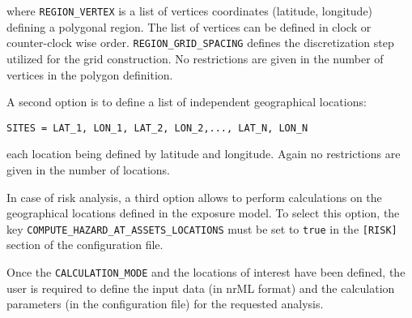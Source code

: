 where \Verb+REGION_VERTEX+ is a list of vertices coordinates (latitude, longitude) defining a polygonal region. The list of vertices can be defined in clock or counter-clock wise order. \Verb+REGION_GRID_SPACING+ defines the discretization step utilized for the grid construction. No restrictions are given in the number of vertices in the polygon definition.

A second option is to define a list of independent geographical locations:
\begin{Verbatim}[frame=single]
SITES = LAT_1, LON_1, LAT_2, LON_2,..., LAT_N, LON_N
\end{Verbatim}
each location being defined by latitude and longitude. Again no restrictions are given in the number of locations.

In case of risk analysis, a third option allows to perform calculations on the geographical locations defined in the exposure model. To select this option, the key \Verb+COMPUTE_HAZARD_AT_ASSETS_LOCATIONS+ must be set to \Verb+true+ in the \Verb+[RISK]+ section of the configuration file.

Once the \Verb+CALCULATION_MODE+ and the locations of interest have been defined, the user is required to define the input data (in nrML format) and the calculation parameters (in the configuration file) for the requested analysis.

